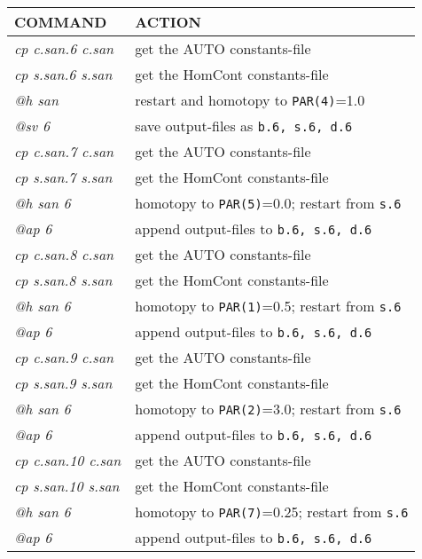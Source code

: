 \documentclass[12pt]{report}
\begin{document}
\begin{table}[htbp]
\begin{center}
\begin{tabular}{| l | l |}
\hline
  COMMAND  & ACTION \\
\hline
  {\it cp c.san.6 c.san} & get the AUTO constants-file \\ 
  {\it cp s.san.6 s.san} & get the HomCont constants-file \\ 
  {\it @h san} & restart and homotopy to {\tt PAR(4)}=1.0 \\ 
  {\it @sv 6} & save output-files as {\tt b.6, s.6, d.6} \\ 
\hline
  {\it cp c.san.7 c.san} & get the AUTO constants-file \\ 
  {\it cp s.san.7 s.san} & get the HomCont constants-file \\ 
  {\it @h san 6} & homotopy to {\tt PAR(5)}=0.0; restart from {\tt s.6} \\ 
  {\it @ap 6} & append output-files to {\tt b.6, s.6, d.6} \\ 
\hline
  {\it cp c.san.8 c.san} & get the AUTO constants-file \\ 
  {\it cp s.san.8 s.san} & get the HomCont constants-file \\ 
  {\it @h san 6} & homotopy to {\tt PAR(1)}=0.5; restart from {\tt s.6} \\ 
  {\it @ap 6} & append output-files to {\tt b.6, s.6, d.6} \\ 
\hline
  {\it cp c.san.9 c.san} & get the AUTO constants-file \\ 
  {\it cp s.san.9 s.san} & get the HomCont constants-file \\ 
  {\it @h san 6} & homotopy to {\tt PAR(2)}=3.0; restart from {\tt s.6} \\ 
  {\it @ap 6} & append output-files to {\tt b.6, s.6, d.6} \\ 
\hline
  {\it cp c.san.10 c.san} & get the AUTO constants-file \\ 
  {\it cp s.san.10 s.san} & get the HomCont constants-file \\ 
  {\it @h san 6} & homotopy to {\tt PAR(7)}=0.25; restart from {\tt s.6} \\ 
  {\it @ap 6} & append output-files to {\tt b.6, s.6, d.6} \\ 

\end{tabular}
\end{center}
\end{table}
\end{document}
